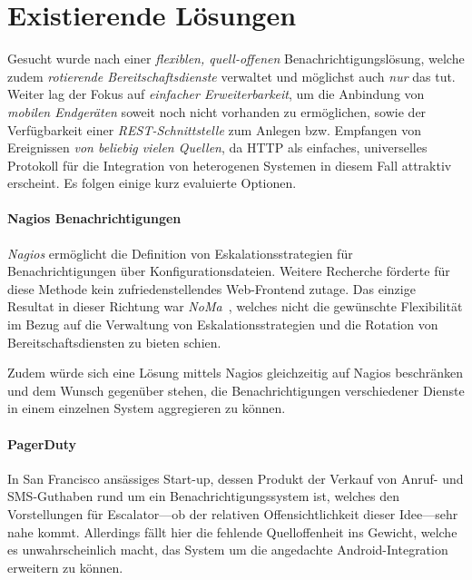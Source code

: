\documentclass[11pt,utf8,notoc,bibnum,german,final]{zihpub}
\begin{document}
\section{Existierende Lösungen}


Gesucht wurde nach einer \emph{flexiblen, quell-offenen}
Benachrichtigungslösung, welche zudem \emph{rotierende Bereitschaftsdienste}
verwaltet und möglichst auch \emph{nur} das tut. Weiter lag der Fokus auf
\emph{einfacher Erweiterbarkeit}, um die Anbindung von \emph{mobilen
Endgeräten} soweit noch nicht vorhanden zu ermöglichen, sowie der Verfügbarkeit
einer \emph{REST-Schnittstelle} zum Anlegen bzw. Empfangen von Ereignissen
\emph{von beliebig vielen Quellen}, da HTTP als einfaches, universelles
Protokoll für die Integration von heterogenen Systemen in diesem Fall attraktiv
erscheint. Es folgen einige kurz evaluierte Optionen.

\paragraph{Nagios Benachrichtigungen~\cite{nagios-notifications}}

\emph{Nagios} ermöglicht die Definition von Eskalationsstrategien für
Benachrichtigungen über Konfigurationsdateien. Weitere Recherche förderte für
diese Methode kein zufriedenstellendes Web-Frontend zutage. Das einzige
Resultat in dieser Richtung war \emph{NoMa}~\cite{noma}, welches nicht die gewünschte
Flexibilität im Bezug auf die Verwaltung von Eskalationsstrategien und die
Rotation von Bereitschaftsdiensten zu bieten schien.

Zudem würde sich eine Lösung mittels Nagios gleichzeitig auf Nagios beschränken
und dem Wunsch gegenüber stehen, die Benachrichtigungen verschiedener Dienste
in einem einzelnen System aggregieren zu können.

\paragraph{PagerDuty~\cite{pagerduty}}

In San Francisco ansässiges Start-up, dessen Produkt der Verkauf von Anruf- und
SMS-Guthaben rund um ein Benachrichtigungssystem ist, welches den Vorstellungen
für Escalator—ob der relativen Offensichtlichkeit dieser Idee—sehr nahe kommt.
Allerdings fällt hier die fehlende Quelloffenheit ins Gewicht, welche es
unwahrscheinlich macht, das System um die angedachte Android-Integration
erweitern zu können.
\end{document}
